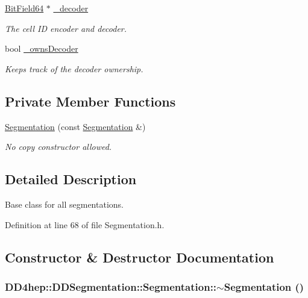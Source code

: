 \begin{DoxyCompactItemize}
\hyperlink{class_d_d4hep_1_1_d_d_segmentation_1_1_bit_field64}{BitField64} $\ast$ \hyperlink{class_d_d4hep_1_1_d_d_segmentation_1_1_segmentation_a48d782572ff008ea0f05c869526735f4}{\_\-decoder}
\begin{DoxyCompactList}\small\item\em The cell ID encoder and decoder. \item\end{DoxyCompactList}\item 
bool \hyperlink{class_d_d4hep_1_1_d_d_segmentation_1_1_segmentation_a0e9e3e6639a67335971b827cf045cd4f}{\_\-ownsDecoder}
\begin{DoxyCompactList}\small\item\em Keeps track of the decoder ownership. \item\end{DoxyCompactList}\end{DoxyCompactItemize}
\subsection*{Private Member Functions}
\begin{DoxyCompactItemize}
\item 
\hyperlink{class_d_d4hep_1_1_d_d_segmentation_1_1_segmentation_aba1d0cb4ca5528c499ecde5f6000ae01}{Segmentation} (const \hyperlink{class_d_d4hep_1_1_d_d_segmentation_1_1_segmentation}{Segmentation} \&)
\begin{DoxyCompactList}\small\item\em No copy constructor allowed. \item\end{DoxyCompactList}\end{DoxyCompactItemize}


\subsection{Detailed Description}
Base class for all segmentations. 

Definition at line 68 of file Segmentation.h.

\subsection{Constructor \& Destructor Documentation}
\hypertarget{class_d_d4hep_1_1_d_d_segmentation_1_1_segmentation_a2865f0e68cb2ecfb5717584e67be4228}{
\subsubsection[{$\sim$Segmentation}]{\setlength{\rightskip}{0pt plus 5cm}DD4hep::DDSegmentation::Segmentation::$\sim$Segmentation ()}}
\label{class_d_d4hep_1_1_d_d_segmentation_1_1_segmentation_a2865f0e68cb2ecfb5717584e67be4228}


